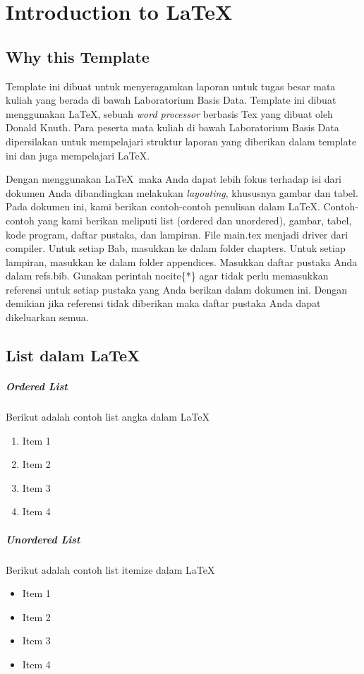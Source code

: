 \chapter{Introduction to \LaTeX}
\section{Why this Template}
Template ini dibuat untuk menyeragamkan laporan untuk tugas besar mata kuliah yang berada di bawah Laboratorium Basis Data. Template ini dibuat menggunakan \LaTeX, sebuah \textit{word processor} berbasis Tex yang dibuat oleh Donald Knuth\cite{knuth:1984}. Para peserta mata kuliah di bawah Laboratorium Basis Data dipersilakan untuk mempelajari struktur laporan yang diberikan dalam template ini dan juga mempelajari \LaTeX.

Dengan menggunakan \LaTeX\  maka Anda dapat lebih fokus terhadap isi dari dokumen Anda dibandingkan melakukan \textit{layouting}, khususnya gambar dan tabel. Pada dokumen ini, kami berikan contoh-contoh penulisan dalam \LaTeX. Contoh-contoh yang kami berikan meliputi list (ordered dan unordered), gambar, tabel, kode program, daftar pustaka, dan lampiran. File main.tex menjadi driver dari compiler. Untuk setiap Bab, masukkan ke dalam folder chapters. Untuk setiap lampiran, masukkan ke dalam folder appendices. Masukkan daftar pustaka Anda dalam refs.bib. Gunakan perintah nocite\{*\} agar tidak perlu memasukkan referensi untuk setiap pustaka yang Anda berikan dalam dokumen ini. Dengan demikian jika referensi tidak diberikan maka daftar pustaka Anda dapat dikeluarkan semua.

\section{List dalam \LaTeX}
\paragraph{\textit{Ordered List}} Berikut adalah contoh list angka dalam \LaTeX
\begin{enumerate}
    \item Item 1
    \item Item 2
    \item Item 3
    \item Item 4
\end{enumerate}

\paragraph{\textit{Unordered List}}Berikut adalah contoh list itemize dalam \LaTeX
\begin{itemize}
    \item Item 1
    \item Item 2
    \item Item 3
    \item Item 4
\end{itemize}

